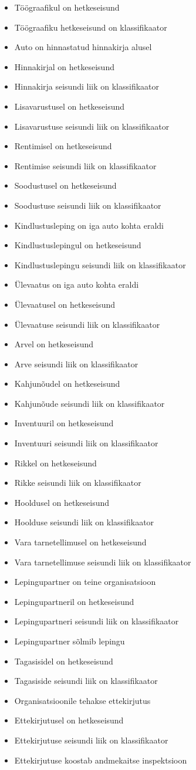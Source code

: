 \begin{itemize}
	\item Töögraafikul on hetkeseisund
	\item Töögraafiku hetkeseisund on klassifikaator
	\item Auto on hinnastatud hinnakirja alusel
	\item Hinnakirjal on hetkeseisund
	\item Hinnakirja seisundi liik on klassifikaator
	\item Lisavarustusel on hetkeseisund
	\item Lisavarustuse seisundi liik on klassifikaator
	\item Rentimisel on hetkeseisund
	\item Rentimise seisundi liik on klassifikaator
	\item Soodustusel on hetkeseisund
	\item Soodustuse seisundi liik on klassifikaator
	\item Kindlustusleping on iga auto kohta eraldi
	\item Kindlustuslepingul on hetkeseisund
	\item Kindlustuslepingu seisundi liik on klassifikaator
	\item Ülevaatus on iga auto kohta eraldi
	\item Ülevaatusel on hetkeseisund
	\item Ülevaatuse seisundi liik on klassifikaator
	\item Arvel on hetkeseisund
	\item Arve seisundi liik on klassifikaator
	\item Kahjunõudel on hetkeseisund
	\item Kahjunõude seisundi liik on klassifikaator
	\item Inventuuril on hetkeseisund
	\item Inventuuri seisundi liik on klassifikaator
	\item Rikkel on hetkeseisund
	\item Rikke seisundi liik on klassifikaator
	\item Hooldusel on hetkeseisund
	\item Hoolduse seisundi liik on klassifikaator
	\item Vara tarnetellimusel on hetkeseisund
	\item Vara tarnetellimuse seisundi liik on klassifikaator
	\item Lepingupartner on teine organisatsioon
	\item Lepingupartneril on hetkeseisund
	\item Lepingupartneri seisundi liik on klassifikaator
	\item Lepingupartner sõlmib lepingu
	\item Tagasisidel on hetkeseisund
	\item Tagasiside seisundi liik on klassifikaator
	\item Organisatsioonile tehakse ettekirjutus 
	\item Ettekirjutusel on hetkeseisund
	\item Ettekirjutuse seisundi liik on klassifikaator
	\item Ettekirjutuse koostab andmekaitse inspektsioon
\end{itemize}

